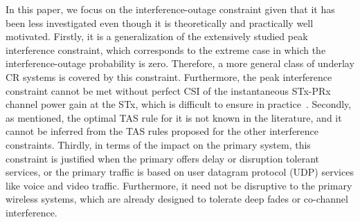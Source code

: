 \documentclass[12pt,draftcls,peerreview,onecolumn]{IEEEtran}
\begin{document}
In this paper, we focus on the interference-outage constraint given that it has been less investigated even though it is theoretically and practically well motivated.  Firstly, it is a generalization of the extensively studied peak interference constraint, which corresponds to the extreme case in which the interference-outage probability is zero. Therefore, a more general class of underlay CR systems is covered by this constraint. Furthermore, the peak interference constraint cannot be met without perfect  CSI of the instantaneous STx-PRx channel power gain at the STx, which is difficult to ensure in practice~\cite{musavian_2009_tcom,Suraweera_2010_TVT,Peng_2016_eurasip}. Secondly, as mentioned, the optimal TAS rule for it is not known in the literature, and it cannot be inferred from the TAS rules proposed for the other interference constraints. Thirdly, in terms of the impact on the primary system, this constraint is justified when the primary offers delay or disruption tolerant services, or the primary traffic is based on user datagram protocol (UDP) services like voice and video traffic. Furthermore, it need not be disruptive to the primary wireless systems, which are already designed to tolerate deep fades or co-channel interference. 
\end{document}
